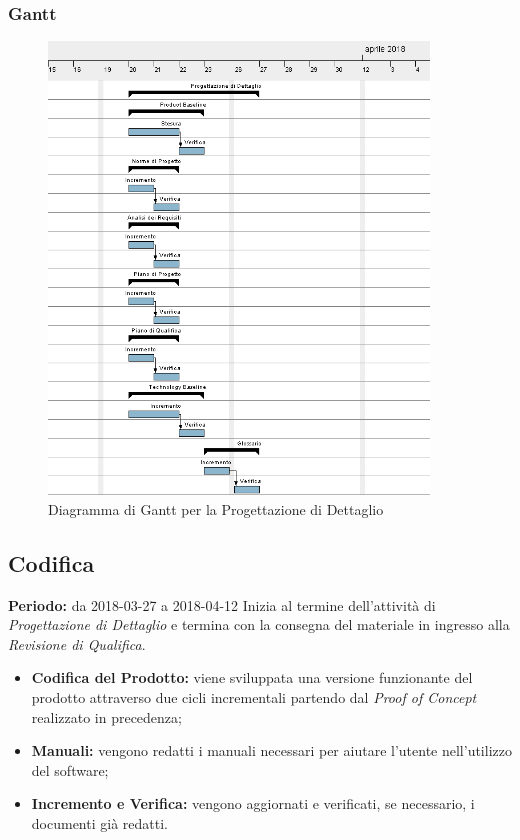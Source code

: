 \subsubsection{Gantt}
\begin{figure}[H]
	\centering 
	\includegraphics[width=0.9\textwidth]{images/Progettazione-Dettaglio.png}
	\caption{Diagramma di Gantt per la Progettazione di Dettaglio}
	\label{graficobello4} 
\end{figure}
\subsection{Codifica}
    \textbf{Periodo:} da 2018-03-27 a 2018-04-12\Spazio
    Inizia al termine dell'attività di \emph{Progettazione di Dettaglio} e termina con la consegna del materiale in ingresso alla \emph{Revisione di Qualifica}.
    \begin{itemize}
    	\item \textbf{Codifica del Prodotto:} viene sviluppata una versione funzionante del prodotto attraverso due cicli incrementali partendo dal \textit{Proof of Concept} realizzato in precedenza;
    	\item \textbf{Manuali:} vengono redatti i manuali necessari per aiutare l'utente nell'utilizzo del software;
    	\item \textbf{Incremento e Verifica:} vengono aggiornati e verificati, se necessario, i documenti già redatti.
    \end{itemize}
